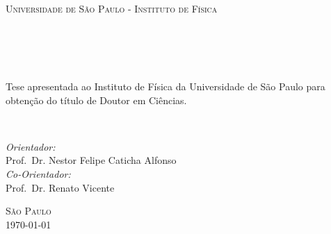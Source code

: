\begin{titlepage}
\begin{fullwidth}
\begin{center}


\textsc{\LARGE Universidade de São Paulo - Instituto de Física}\\[3cm]

\HRule \\[0.4cm]
\textsc{\textit{\titlefont {\titletext}\\[.3cm] \subtitlefont {\subtitletext}}}
\HRule\\[2.2cm]
\textsc{\LARGE \authorinfo }\\[2.5cm]
\hfill\begin{minipage}{0.7\textwidth}
\Large
Tese apresentada ao Instituto de Física da Universidade de São Paulo para obtenção do título de Doutor em Ciências. 
\end{minipage}\\[1.5cm]
\hfill\begin{minipage}{0.7\textwidth}
\Large

\emph{Orientador:} \\
Prof.~Dr. Nestor Felipe Caticha Alfonso\\

\emph{Co-Orientador:} \\
Prof.~Dr. Renato Vicente
\end{minipage}
\vfill

\textsc{\LARGE São Paulo}\\
\textsc{\LARGE \today}

\end{center}
\end{fullwidth}
\end{titlepage}